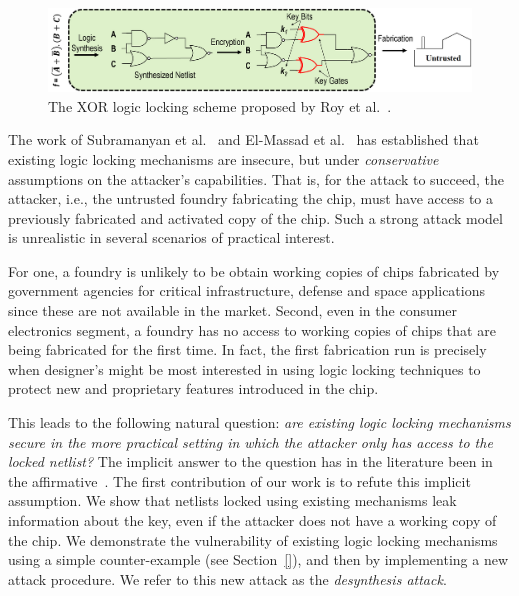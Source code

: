 \begin{figure}
  \centering\includegraphics[width=.8\linewidth]{./figs/lenc-v1}
  \caption{The XOR logic locking scheme proposed by Roy et al.~\cite{roy2008epic}.}
  \label{fig:llock}
\end{figure}


The work of 
Subramanyan et al.~\cite{subramanyan2015evaluating} and El-Massad et al.~\cite{el2015integrated} 
has established that 
existing logic 
locking mechanisms are insecure, but 
under \emph{conservative}  
assumptions on the attacker's capabilities.
That is, for the
attack to succeed, the attacker, i.e., the untrusted foundry fabricating the chip, 
must have access to a previously fabricated and 
activated copy of the chip.
Such a strong attack model 
is unrealistic in several scenarios of 
practical interest. 

For one, a foundry is unlikely to 
be obtain working copies of 
chips fabricated by government agencies for 
critical infrastructure, defense and space applications 
since these are not available in the market.  
Second, even in the consumer electronics segment, a foundry 
has no access to working copies of
chips that are being fabricated for the first time. 
In fact, the first fabrication run is precisely 
when designer's 
might be most interested in using logic locking techniques to 
protect new and proprietary features introduced in the chip. 

This leads to the following natural question: \emph{are existing 
logic locking mechanisms secure in the more 
practical setting in which the attacker only has access to the 
locked netlist?} The implicit answer to the question 
has in the literature been in the affirmative~\cite{roy2008epic}. 
The first contribution of our work is 
to refute this implicit assumption. 
We show that netlists locked using 
existing mechanisms leak information about the key, even if the attacker does not have a working copy of the chip.
We demonstrate the vulnerability 
of existing logic locking mechanisms using a simple counter-example (see Section~\ref{}), and then by implementing a new attack 
procedure. We refer to this new attack as the
\emph{desynthesis attack}. 




